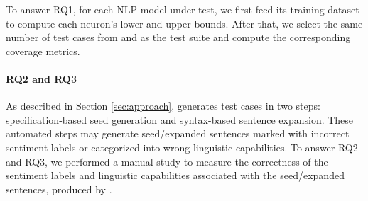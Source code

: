 To answer RQ1, for each NLP model under test, we first feed its
training dataset to compute each neuron's lower and upper
bounds. After that, we select the same number of test cases from \tool
and \Cklst as the test suite and compute the corresponding coverage
metrics.


%
%

\paragraph*{\textbf{RQ2 and RQ3}}  As described in Section \ref{sec:approach},
\tool generates test cases in two steps: specification-based seed
generation and syntax-based sentence expansion. These automated steps
may generate seed/expanded sentences marked with incorrect sentiment
labels or categorized into wrong linguistic capabilities.
To answer RQ2 and RQ3, we performed a manual study to measure the
correctness of the sentiment labels and linguistic capabilities
associated with the seed/expanded sentences, produced by \tool.

